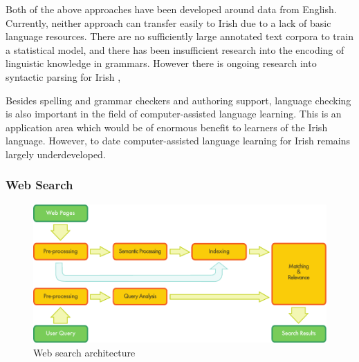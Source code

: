 \begin{multicols}{2}

Both of the above approaches have been developed around data from English. Currently, neither approach can transfer easily to Irish due to a lack of basic language resources. There are no sufficiently large annotated text corpora to train a statistical model, and there has been insufficient research into the encoding of linguistic knowledge in grammars. However there is ongoing research into syntactic parsing for Irish \cite{lynn2012}, \cite{elaine2010}


Besides spelling and grammar checkers and authoring support, language checking is also important in the field of computer-assisted language learning. This is an application area which would be of enormous benefit to learners of the Irish language. However, to date computer-assisted language learning for Irish remains largely underdeveloped.

\subsubsection{Web Search}

\begin{figure}[htb]
  \center
  \includegraphics[width=\textwidth]{../_media/english/web_search_architecture}
  \caption{Web search architecture}
  \label{fig:websearcharch_en}
 \end{figure}


\end{multicols}
